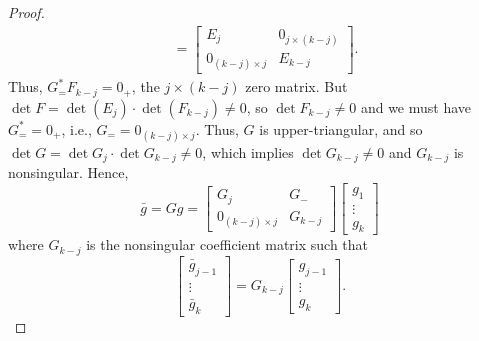\documentclass[10.5pt, oneside, a4paper]{article}
\begin{document}
{\begin{proof}
\begin{align*}
    &= \begin{bmatrix}
        E_j & 0_{j\times (k-j)}\\
        0_{(k-j)\times j} & E_{k-j}
    \end{bmatrix}.
\end{align*}
Thus, $G^*_=F_{k-j}=0_+$, the $j\times (k-j)$ zero matrix. But $\det F = \det(E_j)\cdot \det(F_{k-j})\neq 0$, so $\det F_{k-j}\neq 0$ and we must have $G^*_==0_+$, i.e., $G_= =0_{(k-j)\times j}$. Thus, $G$ is upper-triangular, and so $\det G = \det G_j \cdot \det G_{k-j}\neq 0$, which implies $\det G_{k-j}\neq 0$ and $G_{k-j}$ is nonsingular. Hence,
\[\bar{g} = Gg = \begin{bmatrix}G_j & G_-\\
0_{(k-j)\times j} & G_{k-j}\end{bmatrix} \begin{bmatrix}
g_1\\
\vdots\\
g_k
\end{bmatrix}\]
where $G_{k-j}$ is the nonsingular coefficient matrix such that
\[\begin{bmatrix}
    \bar{g}_{j-1}\\
    \vdots\\
    \bar{g}_{k}
\end{bmatrix} = G_{k-j}\begin{bmatrix}
    g_{j-1}\\
    \vdots\\
    g_{k}
\end{bmatrix}.\]
\end{proof}
}
\end{document}
